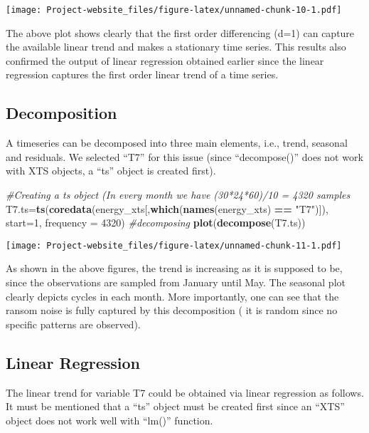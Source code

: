 \documentclass[]{article}
\newenvironment{Shaded}{\begin{snugshade}}{\end{snugshade}}
\newcommand{\KeywordTok}[1]{\textcolor[rgb]{0.13,0.29,0.53}{\textbf{#1}}}
\newcommand{\DataTypeTok}[1]{\textcolor[rgb]{0.13,0.29,0.53}{#1}}
\newcommand{\DecValTok}[1]{\textcolor[rgb]{0.00,0.00,0.81}{#1}}
\newcommand{\StringTok}[1]{\textcolor[rgb]{0.31,0.60,0.02}{#1}}
\newcommand{\CommentTok}[1]{\textcolor[rgb]{0.56,0.35,0.01}{\textit{#1}}}
\newcommand{\OperatorTok}[1]{\textcolor[rgb]{0.81,0.36,0.00}{\textbf{#1}}}
\newcommand{\NormalTok}[1]{#1}
\begin{document}
\texttt{[image: Project-website\_files/figure-latex/unnamed-chunk-10-1.pdf]}

The above plot shows clearly that the first order differencing (d=1) can
capture the available linear trend and makes a stationary time series.
This results also confirmed the output of linear regression obtained
earlier since the linear regression captures the first order linear
trend of a time series.

\subsection{Decomposition}\label{decomposition}

A timeseries can be decomposed into three main elements, i.e., trend,
seasonal and residuals. We selected ``T7'' for this issue (since
``decompose()'' does not work with XTS objects, a ``ts'' object is
created first).

\begin{Shaded}
\begin{Highlighting}[]
\CommentTok{#Creating a ts object (In every month we have (30*24*60)/10 = 4320 samples}
\NormalTok{T7.ts=}\KeywordTok{ts}\NormalTok{(}\KeywordTok{coredata}\NormalTok{(energy_xts[,}\KeywordTok{which}\NormalTok{(}\KeywordTok{names}\NormalTok{(energy_xts) }\OperatorTok{==}\StringTok{ "T7"}\NormalTok{)]), }\DataTypeTok{start=}\DecValTok{1}\NormalTok{, }\DataTypeTok{frequency =} \DecValTok{4320}\NormalTok{)}
\CommentTok{#decomposing}
\KeywordTok{plot}\NormalTok{(}\KeywordTok{decompose}\NormalTok{(T7.ts))}
\end{Highlighting}
\end{Shaded}

\texttt{[image: Project-website\_files/figure-latex/unnamed-chunk-11-1.pdf]}

As shown in the above figures, the trend is increasing as it is supposed
to be, since the observations are sampled from January until May. The
seasonal plot clearly depicts cycles in each month. More importantly,
one can see that the ransom noise is fully captured by this
decomposition ( it is random since no specific patterns are observed).

\subsection{Linear Regression}\label{linear-regression}

The linear trend for variable T7 could be obtained via linear regression
as follows. It must be mentioned that a ``ts'' object must be created
first since an ``XTS'' object does not work well with ``lm()'' function.
\end{document}
